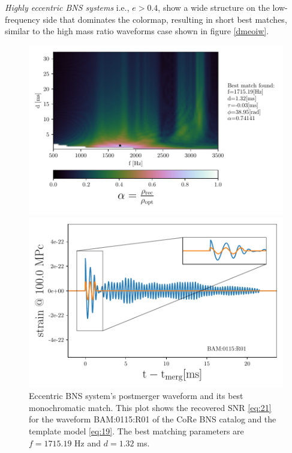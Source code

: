\FloatBarrier
 

\newpage
\textit{Highly eccentric BNS systems} i.e., $e>0.4$, show a wide structure on the low-frequency side that dominates the colormap, resulting in short best matches, similar to the high mass ratio waveforms case shown in figure \ref{dmeoiw}. 


\begin{figure}[!htbp]
\begin{center}
\begin{minipage}[t]{0.5\linewidth}
\vspace{0pt}
\includegraphics[scale=0.6,trim={2mm 0 35mm 0},clip]{images/Data_analysis/results/2D_grid_9.pdf}
\end{minipage}%
\begin{minipage}[t]{0.5\linewidth}
\vspace{20pt}
\includegraphics[scale=0.45]{images/Data_analysis/results/2D_grid_10.pdf}
\end{minipage}
\captionsetup{width=0.8\textwidth}
\caption[Eccentric BNS system's postmerger waveform and its best monochromatic match]{Eccentric BNS system's postmerger waveform and its best monochromatic match. This plot shows the recovered SNR \ref{eq:21} for the waveform BAM:0115:R01 of the CoRe BNS catalog \cite{Dietrich:2018phi} and the template model \ref{eq:19}. The best matching parameters are $f=1715.19$ Hz and $d=1.32$ ms.}
\label{ecc}
\end{center}
\end{figure}


